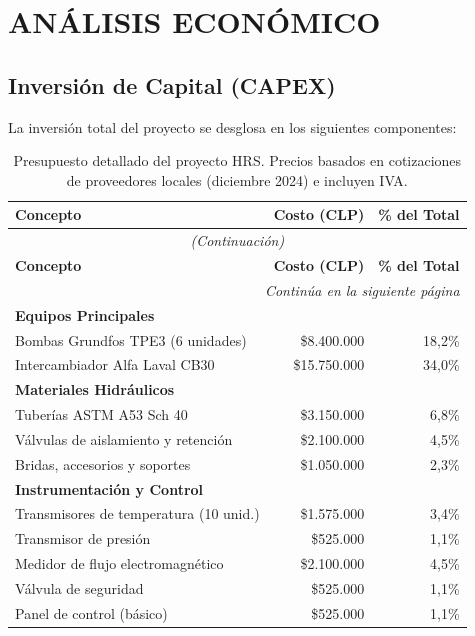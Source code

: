 \documentclass[12pt,a4paper]{article}
\begin{document}
\newpage

\section{ANÁLISIS ECONÓMICO}

\subsection{Inversión de Capital (CAPEX)}

La inversión total del proyecto se desglosa en los siguientes componentes:

\begin{longtable}{p{6cm}rr}
\caption{Presupuesto detallado del proyecto HRS. Precios basados en cotizaciones de proveedores locales (diciembre 2024) e incluyen IVA.} \\
\label{tab:presupuesto_capex}
\toprule
\textbf{Concepto} & \textbf{Costo (CLP)} & \textbf{\% del Total} \\
\midrule
\endfirsthead
\multicolumn{3}{c}{\textit{(Continuación)}} \\
\toprule
\textbf{Concepto} & \textbf{Costo (CLP)} & \textbf{\% del Total} \\
\midrule
\endhead
\midrule
\multicolumn{3}{r}{\textit{Continúa en la siguiente página}} \\
\endfoot
\bottomrule
\endlastfoot
\textbf{Equipos Principales} & & \\
Bombas Grundfos TPE3 (6 unidades) & \$8.400.000 & 18,2\% \\
Intercambiador Alfa Laval CB30 & \$15.750.000 & 34,0\% \\
\textbf{Materiales Hidráulicos} & & \\
Tuberías ASTM A53 Sch 40 & \$3.150.000 & 6,8\% \\
Válvulas de aislamiento y retención & \$2.100.000 & 4,5\% \\
Bridas, accesorios y soportes & \$1.050.000 & 2,3\% \\
\textbf{Instrumentación y Control} & & \\
Transmisores de temperatura (10 unid.) & \$1.575.000 & 3,4\% \\
Transmisor de presión & \$525.000 & 1,1\% \\
Medidor de flujo electromagnético & \$2.100.000 & 4,5\% \\
Válvula de seguridad & \$525.000 & 1,1\% \\
Panel de control (básico) & \$525.000 & 1,1\% \\

\end{longtable}
\end{document}
